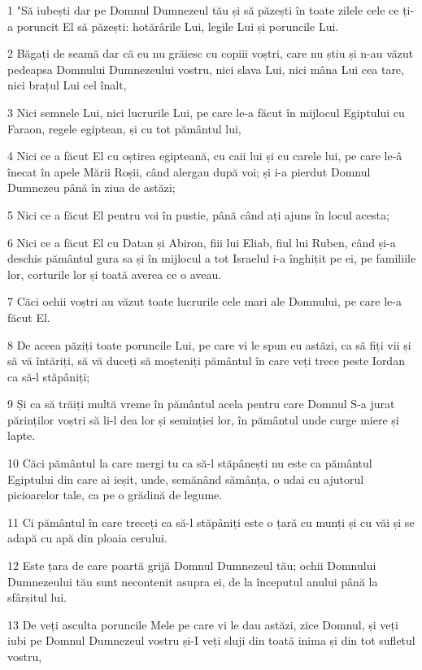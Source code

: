 \par 1 "Să iubești dar pe Domnul Dumnezeul tău și să păzești în toate zilele cele ce ți-a poruncit El să păzești: hotărârile Lui, legile Lui și poruncile Lui.
\par 2 Băgați de seamă dar că eu nu grăiesc cu copiii voștri, care nu știu și n-au văzut pedeapsa Domnului Dumnezeului vostru, nici slava Lui, nici mâna Lui cea tare, nici brațul Lui cel înalt,
\par 3 Nici semnele Lui, nici lucrurile Lui, pe care le-a făcut în mijlocul Egiptului cu Faraon, regele egiptean, și cu tot pământul lui,
\par 4 Nici ce a făcut El cu oștirea egipteană, cu caii lui și cu carele lui, pe care le-â înecat în apele Mării Roșii, când alergau după voi; și i-a pierdut Domnul Dumnezeu până în ziua de astăzi;
\par 5 Nici ce a făcut El pentru voi în pustie, până când ați ajuns în locul acesta;
\par 6 Nici ce a făcut El cu Datan și Abiron, fiii lui Eliab, fiul lui Ruben, când și-a deschis pământul gura sa și în mijlocul a tot Israelul i-a înghițit pe ei, pe familiile lor, corturile lor și toată averea ce o aveau.
\par 7 Căci ochii voștri au văzut toate lucrurile cele mari ale Domnului, pe care le-a făcut El.
\par 8 De aceea păziți toate poruncile Lui, pe care vi le spun eu astăzi, ca să fiți vii și să vă întăriți, să vă duceți să moșteniți pământul în care veți trece peste Iordan ca să-l stăpâniți;
\par 9 Și ca să trăiți multă vreme în pământul acela pentru care Domnul S-a jurat părinților voștri să li-l dea lor și seminției lor, în pământul unde curge miere și lapte.
\par 10 Căci pământul la care mergi tu ca să-l stăpânești nu este ca pământul Egiptului din care ai ieșit, unde, semănând sămânța, o udai cu ajutorul picioarelor tale, ca pe o grădină de legume.
\par 11 Ci pământul în care treceți ca să-l stăpâniți este o țară cu munți și cu văi și se adapă cu apă din ploaia cerului.
\par 12 Este țara de care poartă grijă Domnul Dumnezeul tău; ochii Domnului Dumnezeului tău sunt necontenit asupra ei, de la începutul anului până la sfârșitul lui.
\par 13 De veți asculta poruncile Mele pe care vi le dau astăzi, zice Domnul, și veți iubi pe Domnul Dumnezeul vostru și-I veți sluji din toată inima și din tot sufletul vostru,
